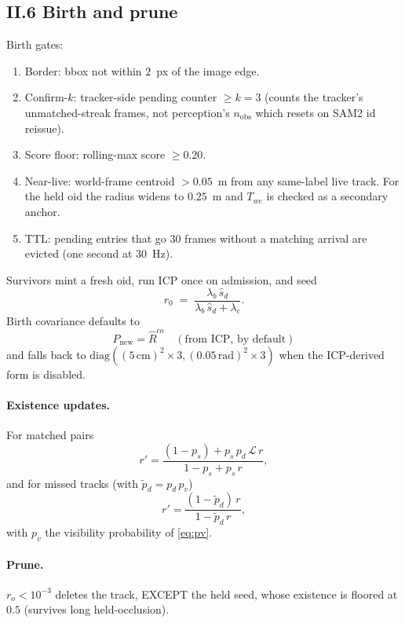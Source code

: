 \documentclass[11pt]{article}
\begin{document}
\subsection*{II.6 Birth and prune}

Birth gates:
\begin{enumerate}[leftmargin=1.5em,itemsep=0pt,topsep=2pt]
\item Border: bbox not within $2$~px of the image edge.
\item Confirm-$k$: tracker-side pending counter $\ge k=3$ (counts the
  tracker's unmatched-streak frames, not perception's $n_{\text{obs}}$ which
  resets on SAM2 id reissue).
\item Score floor: rolling-max score $\ge 0.20$.
\item Near-live: world-frame centroid $> 0.05$~m from any same-label live
  track. For the held oid the radius widens to $0.25$~m and $T_{we}$ is
  checked as a secondary anchor.
\item TTL: pending entries that go $30$ frames without a matching arrival
  are evicted (one second at $30$~Hz).
\end{enumerate}
Survivors mint a fresh oid, run ICP once on admission, and seed
\begin{equation}\label{eq:birth_r}
r_0 \;=\; \frac{\lambda_b\,\hat s_d}{\lambda_b\,\hat s_d + \lambda_c}.
\end{equation}
Birth covariance defaults to
\begin{equation}\label{eq:birth_state}
P_{\text{new}} = \hat R^{co}\quad (\text{from ICP, by default})
\end{equation}
and falls back to
$\mathrm{diag}((5\,\text{cm})^2{\times}3,(0.05\,\text{rad})^2{\times}3)$
when the ICP-derived form is disabled.

\paragraph{Existence updates.}
For matched pairs
\begin{equation}\label{eq:r_assoc}
r' = \frac{(1 - p_s) + p_s\,p_d\,\mathcal L\,r}{1 - p_s + p_s\,r},
\end{equation}
and for missed tracks (with $\tilde p_d = p_d\,p_v$)
\begin{equation}\label{eq:r_miss}
r' = \frac{(1 - \tilde p_d)\,r}{1 - \tilde p_d\,r},
\end{equation}
with $p_v$ the visibility probability of \eqref{eq:pv}.

\paragraph{Prune.}
$r_o < 10^{-3}$ deletes the track, EXCEPT the held seed, whose existence is
floored at $0.5$ (survives long held-occlusion).
\end{document}
